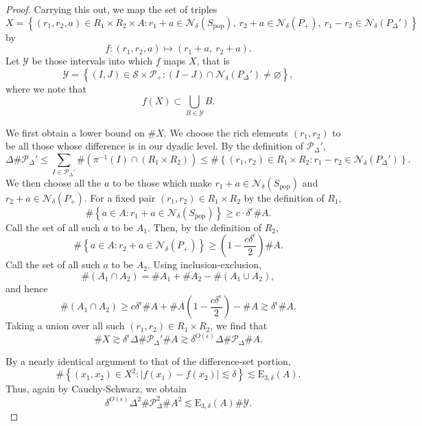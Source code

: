 \documentclass[12pt]{amsart}
\newcommand{\cS}{\mathcal{S}}
\newcommand{\cP}{\mathcal{P}}
\newcommand{\1}{\mathbf{1}}
\newcommand{\cY}{\mathcal{Y}}
\begin{document}
\begin{proof}
Carrying this out, we map the set of triples
\[
	X = \left\{ (r_1,r_2,a)\in R_1 \times R_2 \times A : r_1 + a \in \mathcal{N} _{\delta} (S_{\text{pop}} ),~ r_2 + a \in \mathcal{N} _{\delta} (P_{+} ),~ r_1 - r_2 \in \mathcal{N} _{\delta} (P_{\Delta}' ) \right\} 
\]
by
\[
	f : (r_1,r_2,a) \mapsto (r_1 + a ,~ r_2 + a)
.\]
Let \(\mathcal{Y} \) be those intervals into which \(f\) maps \(X\), that is
\[
	\mathcal{Y} = \left\{ (I,J)\in\cS \times \cP_{+}  	: \left( I - J \right) \cap \mathcal{N} _{\delta} (P_{\Delta} ') \neq \varnothing  \right\} 	
,\]
where we note that
\[
	f(X) \subset \bigcup_{B \in \cY} B
.\]

We first obtain a lower bound on \(\# X\).
We choose the rich elements \((r_1,r_2)\) to be all those whose difference is in our dyadic level.
By the definition of \(\mathcal{P} _{\Delta} '\), 
\[
	\Delta \# \mathcal{P} _{\Delta}' \leq \sum _{I \in \mathcal{P} _{\Delta}' } \# \left( \pi ^{-1} (I)\cap (R_1 \times R_2) \right) \leq  \# \left\{ (r_1,r_2)\in R_1 \times R_2 : r_1 - r_2 \in \mathcal{N} _{\delta} (P_{\Delta}' )  \right\} 
.\]
We then choose all the \(a\) to be those which make \(r_1 + a \in \mathcal{N} _{\delta} (S_{\text{pop}} ) \) and \(r_2 + a \in \mathcal{N} _{\delta} (P_{+} 	) \).
For a fixed pair \((r_1,r_2)\in R_1 \times R_2\) by the definition of \(R_1\),
\[
	\# \left\{ a \in A : r_1 + a \in \mathcal{N} _{\delta} (S_{\text{pop}} ) \right\} \geq c \cdot \delta^{\epsilon}\# A
.\]
Call the set of all such \(a\) to be \(A_1\). Then, by the definition of \(R_2\),
\[
	\# \left\{ a \in A : r_2 + a \in \mathcal{N} _{\delta} (P_{+} )  \right\} \geq \left( 1 - \frac{c \delta ^{\epsilon}}{2}  \right) \# A
.\]
Call the set of all such \(a\) to be \(A_2\).
Using inclusion-exclusion,
\[
	\# \left( A_1 \cap A_2 \right) = \# A_1 + \# A_2 - \# \left( A_1 \cup A_2 \right) 
,\]
and hence
\[
	\# \left( A_1 \cap A_2 \right) \geq c \delta^{\epsilon}\# A + \# A \left( 1 - \frac{c \delta^{\epsilon}}{2}  \right) - \# A \gtrsim \delta^{\epsilon} \# A
.\]
Taking a union over all such \((r_1,r_2)\in R_1 \times R_2\), we find that
\[
	\# X \gtrsim \delta^{\epsilon} \Delta \# \mathcal{P} _{\Delta}' \# A \gtrsim \delta^{O(\epsilon)} \Delta \# \mathcal{P} _{\Delta}  \# A
.\]

By a nearly identical argument to that of the difference-set portion,
\[
	\# \left\{ (x_1,x_2)\in X^{2} : \left\lvert f(x_1) - f(x_2) \right\rvert \lesssim \delta \right\} \lesssim \mathrm{E} _{3,\delta} (A)
.\]
Thus, again by Cauchy-Schwarz, we obtain
\begin{equation} \label{eq:sum-post-CS}
	\delta^{O(\epsilon)} \Delta^{2} \# \mathcal{P} _{\Delta} ^{2}\# A ^{2} \lesssim \mathrm{E} _{3,\delta} (A) \# \mathcal{Y} .
\end{equation}


\end{proof}
\end{document}
